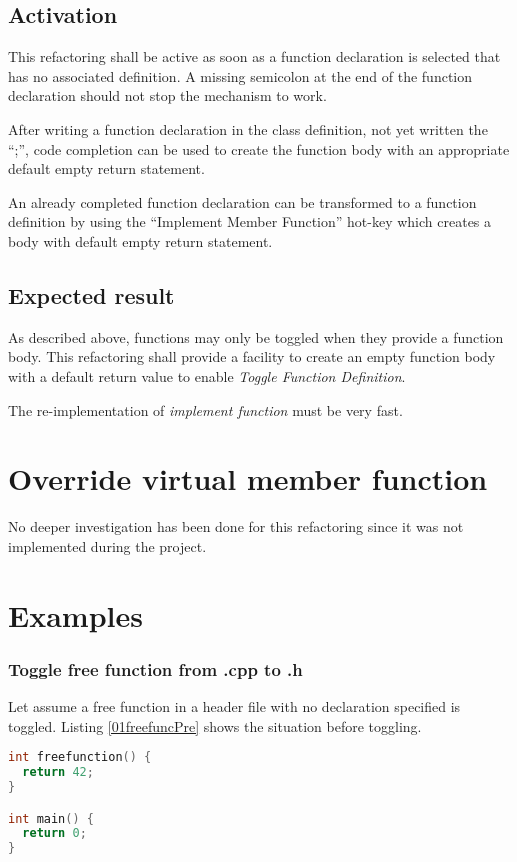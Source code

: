 \subsection{Activation}
This refactoring shall be active as soon as a function declaration is selected 
that has no associated definition. A missing semicolon at the end of the 
function declaration should not stop the mechanism to work.

After writing a function declaration in the class definition, not yet written
the ``;'', code completion can be used to create the function body with an
appropriate default empty return statement.\newline

An already completed function declaration can be transformed to a function
definition by using the ``Implement Member Function'' hot-key which creates a
body with default empty return statement.

\subsection{Expected result}
As described above, functions may only be toggled when they provide a function 
body. This refactoring shall provide a facility to create an empty function body 
with a default return value to enable \textit{Toggle Function Definition}.

The re-implementation of \textit{implement function} must be very fast. 

\section{Override virtual member function}

No deeper investigation has been done for this refactoring since it was not 
implemented during the project.

\section{Examples}

\subsubsection{Toggle free function from .cpp to .h}
Let assume a free function in a header file with no declaration specified is
toggled. Listing \nolinebreak\ref{01freefuncPre} shows the situation before
toggling. 

\begin{lstlisting}[caption={A.cpp},label={01freefuncPre},language=C++]
int freefunction() {
  return 42;
}

int main() {
  return 0;
}
\end{lstlisting}

